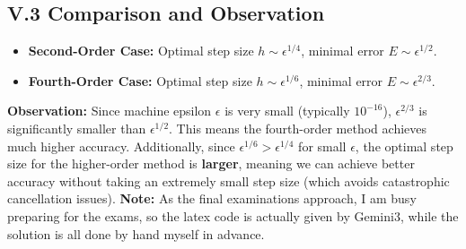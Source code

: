 \documentclass[a4paper]{article}
\begin{document}
\subsection*{V.3 Comparison and Observation}
\begin{itemize}
    \item \textbf{Second-Order Case:} Optimal step size $h \sim \epsilon^{1/4}$, minimal error $E \sim \epsilon^{1/2}$.
    \item \textbf{Fourth-Order Case:} Optimal step size $h \sim \epsilon^{1/6}$, minimal error $E \sim \epsilon^{2/3}$.
\end{itemize}
\textbf{Observation:} Since machine epsilon $\epsilon$ is very small (typically $10^{-16}$), $\epsilon^{2/3}$ is significantly smaller than $\epsilon^{1/2}$. This means the fourth-order method achieves much higher accuracy. Additionally, since $\epsilon^{1/6} > \epsilon^{1/4}$ for small $\epsilon$, the optimal step size for the higher-order method is \textbf{larger}, meaning we can achieve better accuracy without taking an extremely small step size (which avoids catastrophic cancellation issues).
\newline
\newline\newline\newline
\textbf{Note:} As the final examinations approach, I am busy preparing for the exams, so the latex code is actually given by Gemini3, while the solution is all done by hand myself in advance. 
\end{document}
